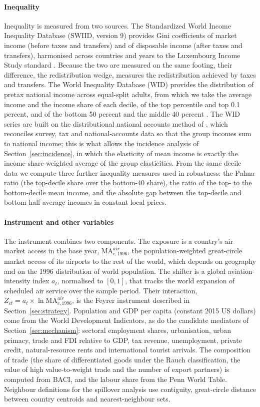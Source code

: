 \paragraph{Inequality}
Inequality is measured from two sources. The Standardized World Income Inequality Database (SWIID, version 9) provides Gini coefficients of market income (before taxes and transfers) and of disposable income (after taxes and transfers), harmonised across countries and years to the Luxembourg Income Study standard \citep{Solt_2020}. Because the two are measured on the same footing, their difference, the redistribution wedge, measures the redistribution achieved by taxes and transfers. The World Inequality Database (WID) provides the distribution of pretax national income across equal-split adults, from which we take the average income and the income share of each decile, of the top percentile and top 0.1 percent, and of the bottom 50 percent and the middle 40 percent \citep{WID_2024}. The WID series are built on the distributional national accounts method of \citet{Piketty_2017}, which reconciles survey, tax and national-accounts data so that the group incomes sum to national income; this is what allows the incidence analysis of Section~\ref{sec:incidence}, in which the elasticity of mean income is exactly the income-share-weighted average of the group elasticities. From the same decile data we compute three further inequality measures used in robustness: the Palma ratio (the top-decile share over the bottom-40 share), the ratio of the top- to the bottom-decile mean income, and the absolute gap between the top-decile and bottom-half average incomes in constant local prices.

\paragraph{Instrument and other variables}
The instrument combines two components. The exposure is a country's air market access in the base year, $\mathrm{MA}^{air}_{c,1996}$, the population-weighted great-circle market access of its airports to the rest of the world, which depends on geography and on the 1996 distribution of world population. The shifter is a global aviation-intensity index $a_t$, normalised to $[0,1]$, that tracks the world expansion of scheduled air service over the sample period. Their interaction, $Z_{ct}=a_t\times\ln\mathrm{MA}^{air}_{c,1996}$, is the Feyrer instrument described in Section~\ref{sec:strategy}. Population and GDP per capita (constant 2015 US dollars) come from the World Development Indicators, as do the candidate mediators of Section~\ref{sec:mechanism}: sectoral employment shares, urbanisation, urban primacy, trade and FDI relative to GDP, tax revenue, unemployment, private credit, natural-resource rents and international tourist arrivals. The composition of trade (the share of differentiated goods under the Rauch classification, the value of high value-to-weight trade and the number of export partners) is computed from BACI, and the labour share from the Penn World Table. Neighbour definitions for the spillover analysis use contiguity, great-circle distance between country centroids and nearest-neighbour sets.

